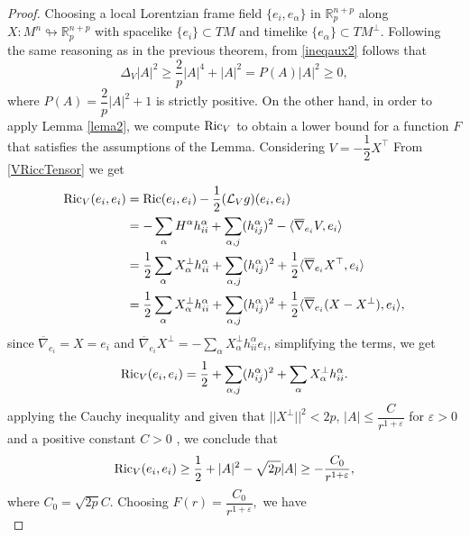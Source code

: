 \documentclass[leqno,11pt]{amsart}
\theoremstyle{plain}
\theoremstyle{definition}
\numberwithin{equation}{section}
\begin{document}
\begin{proof}
Choosing a local Lorentzian frame field $\{e_i,e_\alpha\}$ in $\mathbb R_p^{n+p}$ along $X:M^n\looparrowright\mathbb R^{n+p}_{p}$ with spacelike $\{e_i\}\subset TM$ and timelike $\{e_\alpha\}\subset TM^\perp$.	Following the same reasoning as in the previous theorem, from \eqref{ineqaux2} follows that 
\begin{equation}\label{1estimativa}
\Delta_V |A|^{2}\geq\frac{2}{p}|A|^{4}+|A|^{2} = P(A)  |A|^2 \geq 0,
\end{equation}	
where $P(A) = \dfrac{2}{p}|A|^2 + 1$ is strictly positive. On the other hand, in order to apply Lemma \ref{lema2}, we compute ${\rm Ric}_V$ to obtain a lower bound for a function $F$ that satisfies the assumptions of the Lemma. Considering $V=-\dfrac{1}{2}X^\top$ From \eqref{VRiccTensor} we get
$$
\begin{aligned}
{\rm Ric}_V(e_i, e_i) 
& = {\rm Ric}(e_i, e_i) - \dfrac{1}{2}(\mathcal{L}_V g)(e_i, e_i) \\
& = - \sum_{\alpha} H^\alpha h^\alpha_{ii} + \sum_{\alpha, j} (h^\alpha_{ij})^2 - \langle \overline{\nabla}_{e_i} V, e_i \rangle \\
& = \dfrac{1}{2}\sum_{\alpha} X_\alpha^\perp h^\alpha_{ii} + \sum_{\alpha, j} (h^\alpha_{ij})^2 + \dfrac{1}{2} \langle \overline{\nabla}_{e_i} X^\top, e_i \rangle \\
& = \dfrac{1}{2}\sum_{\alpha} X_\alpha^\perp h^\alpha_{ii} + \sum_{\alpha, j} (h^\alpha_{ij})^2 + \dfrac{1}{2} \langle \overline{\nabla}_{e_i} (X - X^\perp), e_i \rangle, \\
\end{aligned}
$$
since $\overline{\nabla}_{e_i} = X = e_i$ and $\overline{\nabla}_{e_i} X^\perp = - \displaystyle\sum_{\alpha} X^\perp_\alpha h^{\alpha}_{ii} e_i$, simplifying the terms, we get
\begin{equation}
{\rm Ric}_V(e_i, e_i) = \dfrac{1}{2} +  \sum_{\alpha, j} (h^\alpha_{ij})^2 + \sum_\alpha X^\perp_\alpha h^{\alpha}_{ii}.
\end{equation}
applying the Cauchy inequality and given that $||X^\perp ||^2<2p$, $|A|\leq \dfrac{C}{r^{1+ \varepsilon}}$ for $\varepsilon > 0$ and a positive constant $C>0$ , we conclude that
\begin{equation}
{\rm Ric}_V(e_i, e_i) \geq \dfrac{1}{2} + |A|^2 - \sqrt{2p}|A| \geq - \dfrac{C_0}{r^{1+ \varepsilon}},
\end{equation}
where $C_0 = \sqrt{2p}C$. Choosing $F(r) = \dfrac{C_0}{r^{1+\varepsilon}},$ we have
\begin{equation}

\end{equation}
\end{proof}
\end{document}
